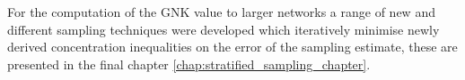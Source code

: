 For the computation of the GNK value to larger networks a range of new and different sampling techniques were developed which iteratively minimise newly derived concentration inequalities on the error of the sampling estimate, these are presented in the final chapter \ref{chap:stratified_sampling_chapter}.



